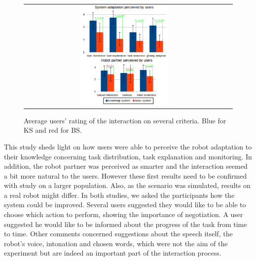  \begin{figure}[ht!]
 \centering
 \begin{tabular}{cc}
  \includegraphics[width=0.45\textwidth]{img/plan_management/respvalue3.png}
 \end{tabular}
 \caption{Average users' rating of the interaction on several criteria. Blue for KS and red for BS.}
 \label{fig:plan_management-results}
 \end{figure}

This study sheds light on how users were able to perceive the robot adaptation to their knowledge concerning task distribution, task explanation and monitoring. In addition, the robot partner was perceived as smarter and the interaction seemed a bit more natural to the users. However these first results need to be confirmed with study on a larger population. Also, as the scenario was simulated, results on a real robot might differ.
In both studies, we asked the participants how the system could be improved. Several users suggested they would like to be able to choose which action to perform, showing the importance of negotiation. A user suggested he would like to be informed about the progress of the task from time to time. Other comments concerned suggestions about the speech itself, the robot's voice, intonation and chosen words, which were not the aim of the experiment but are indeed an important part of the interaction process. 

%


